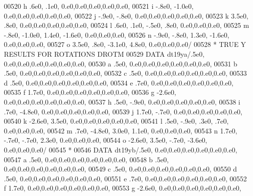 \begin{DoxyCode}
00520      h            .6e0,   .1e0,             0.e0,0.e0,0.e0,0.e0,0.e0,
00521      i           -.8e0, -1.0e0,             0.e0,0.e0,0.e0,0.e0,0.e0,
00522      j           -.9e0,  -.8e0,             0.e0,0.e0,0.e0,0.e0,0.e0,
00523      k           3.5e0,   .8e0,             0.e0,0.e0,0.e0,0.e0,0.e0,
00524      l            .6e0,   .1e0,  -.5e0,   .8e0,          0.e0,0.e0,0.e0,
00525      m           -.8e0, -1.0e0,  1.4e0, -1.6e0,          0.e0,0.e0,0.e0,
00526      n           -.9e0,  -.8e0,  1.3e0, -1.6e0,          0.e0,0.e0,0.e0,
00527      o           3.5e0,   .8e0, -3.1e0,  4.8e0,          0.e0,0.e0,0.e0/
00528 \textcolor{comment}{*                        TRUE Y RESULTS FOR ROTATIONS DROTM}
00529       \textcolor{keyword}{DATA} dt19ya/.5e0,                  0.e0,0.e0,0.e0,0.e0,0.e0,0.e0,
00530      a            .5e0,                  0.e0,0.e0,0.e0,0.e0,0.e0,0.e0,
00531      b            .5e0,                  0.e0,0.e0,0.e0,0.e0,0.e0,0.e0,
00532      c            .5e0,                  0.e0,0.e0,0.e0,0.e0,0.e0,0.e0,
00533      d            .5e0,                  0.e0,0.e0,0.e0,0.e0,0.e0,0.e0,
00534      e            .7e0,                  0.e0,0.e0,0.e0,0.e0,0.e0,0.e0,
00535      f           1.7e0,                  0.e0,0.e0,0.e0,0.e0,0.e0,0.e0,
00536      g          -2.6e0,                  0.e0,0.e0,0.e0,0.e0,0.e0,0.e0,
00537      h            .5e0,  -.9e0,             0.e0,0.e0,0.e0,0.e0,0.e0,
00538      i            .7e0, -4.8e0,             0.e0,0.e0,0.e0,0.e0,0.e0,
00539      j           1.7e0,  -.7e0,             0.e0,0.e0,0.e0,0.e0,0.e0,
00540      k          -2.6e0,  3.5e0,             0.e0,0.e0,0.e0,0.e0,0.e0,
00541      l            .5e0,  -.9e0,   .3e0,   .7e0,          0.e0,0.e0,0.e0,
00542      m            .7e0, -4.8e0,  3.0e0,  1.1e0,          0.e0,0.e0,0.e0,
00543      n           1.7e0,  -.7e0,  -.7e0,  2.3e0,          0.e0,0.e0,0.e0,
00544      o          -2.6e0,  3.5e0,  -.7e0, -3.6e0,          0.e0,0.e0,0.e0/
00545 \textcolor{comment}{*}
00546       \textcolor{keyword}{DATA} dt19yb/.5e0,                  0.e0,0.e0,0.e0,0.e0,0.e0,0.e0,
00547      a            .5e0,                  0.e0,0.e0,0.e0,0.e0,0.e0,0.e0,
00548      b            .5e0,                  0.e0,0.e0,0.e0,0.e0,0.e0,0.e0,
00549      c            .5e0,                  0.e0,0.e0,0.e0,0.e0,0.e0,0.e0,
00550      d            .5e0,                  0.e0,0.e0,0.e0,0.e0,0.e0,0.e0,
00551      e            .7e0,                  0.e0,0.e0,0.e0,0.e0,0.e0,0.e0,
00552      f           1.7e0,                  0.e0,0.e0,0.e0,0.e0,0.e0,0.e0,
00553      g          -2.6e0,                  0.e0,0.e0,0.e0,0.e0,0.e0,0.e0,

\end{DoxyCode}

